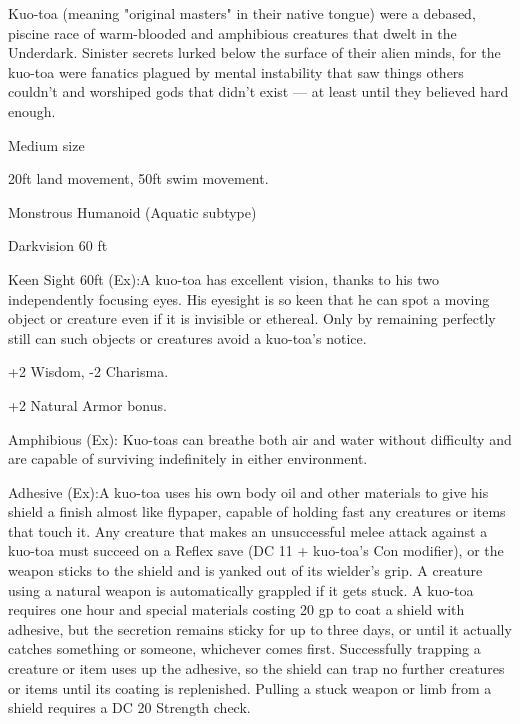 
Kuo-toa (meaning "original masters" in their native tongue) were a debased, piscine race of warm-blooded and amphibious creatures that dwelt in the Underdark. Sinister secrets lurked below the surface of their alien minds, for the kuo-toa were fanatics plagued by mental instability that saw things others couldn't and worshiped gods that didn't exist — at least until they believed hard enough.

\begin{multicols}{2}

\begin{itemize*}
\item Medium size
\item 20ft land movement, 50ft swim movement.
\item Monstrous Humanoid (Aquatic subtype)
\item Darkvision 60 ft
\item Keen Sight 60ft (Ex):A kuo-toa has excellent vision, thanks to his two independently focusing eyes. His eyesight is so keen that he can spot a moving object or creature even if it is invisible or ethereal. Only by remaining perfectly still can such objects or creatures avoid a kuo-toa's notice.
\item +2 Wisdom, -2 Charisma.
\item +2 Natural Armor bonus.
\item Amphibious (Ex): Kuo-toas can breathe both air and water without difficulty and are capable of surviving indefinitely in either environment.
\item Adhesive (Ex):A kuo-toa uses his own body oil and other materials to give his shield a finish almost like flypaper, capable of holding fast any creatures or items that touch it. Any creature that makes an unsuccessful melee attack against a kuo-toa must succeed on a Reflex save (DC 11 + kuo-toa's Con modifier), or the weapon sticks to the shield and is yanked out of its wielder's grip. A creature using a natural weapon is automatically grappled if it gets stuck. A kuo-toa requires one hour and special materials costing 20 gp to coat a shield with adhesive, but the secretion remains sticky for up to three days, or until it actually catches something or someone, whichever comes first. Successfully trapping a creature or item uses up the adhesive, so the shield can trap no further creatures or items until its coating is replenished. Pulling a stuck weapon or limb from a shield requires a DC 20 Strength check.

\end{itemize*}
\end{multicols}
